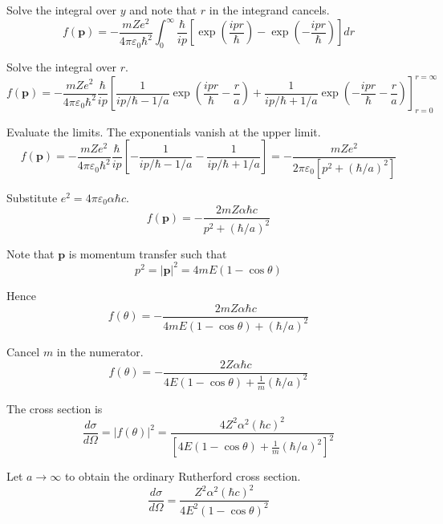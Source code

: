 Solve the integral over $y$ and note that $r$ in the integrand cancels.
\begin{equation*}
f(\mathbf p)=-\frac{mZe^2}{4\pi\varepsilon_0\hbar^2}
\int_0^\infty
\frac{\hbar}{ip}
\left[\exp\left(\frac{ipr}{\hbar}\right)-\exp\left(-\frac{ipr}{\hbar}\right)\right]
dr
\end{equation*}

Solve the integral over $r$.
\begin{equation*}
f(\mathbf p)=-\frac{mZe^2}{4\pi\varepsilon_0\hbar^2}
\frac{\hbar}{ip}
\left[
\frac{1}{ip/\hbar-1/a}
\exp\left(\frac{ipr}{\hbar}-\frac{r}{a}\right)
+\frac{1}{ip/\hbar+1/a}
\exp\left(-\frac{ipr}{\hbar}-\frac{r}{a}\right)
\right]_{r=0}^{r=\infty}
\end{equation*}

Evaluate the limits. The exponentials vanish at the upper limit.
\begin{equation*}
f(\mathbf p)=-\frac{mZe^2}{4\pi\varepsilon_0\hbar^2}
\frac{\hbar}{ip}
\left[
-\frac{1}{ip/\hbar-1/a}
-\frac{1}{ip/\hbar+1/a}
\right]
=-\frac{mZe^2}{2\pi\varepsilon_0\left[p^2+(\hbar/a)^2\right]}
\tag{1}
\end{equation*}

Substitute $e^2=4\pi\varepsilon_0\alpha\hbar c$.
\begin{equation*}
f(\mathbf p)=-\frac{2mZ\alpha\hbar c}{p^2+(\hbar/a)^2}
\end{equation*}

Note that $\mathbf p$ is momentum transfer such that
\begin{equation*}
p^2=|\mathbf p|^2=4mE(1-\cos\theta)
\end{equation*}

Hence
\begin{equation*}
f(\theta)=-\frac{2mZ\alpha\hbar c}{4mE(1-\cos\theta)+(\hbar/a)^2}
\tag{2}
\end{equation*}

Cancel $m$ in the numerator.
\begin{equation*}
f(\theta)=-\frac{2Z\alpha\hbar c}{4E(1-\cos\theta)+\frac{1}{m}(\hbar/a)^2}
\end{equation*}

The cross section is
\begin{equation*}
\frac{d\sigma}{d\Omega}=|f(\theta)|^2
=\frac{4Z^2\alpha^2(\hbar c)^2}{\left[4E(1-\cos\theta)+\frac{1}{m}(\hbar/a)^2\right]^2}
\end{equation*}

Let $a\rightarrow\infty$ to obtain the ordinary Rutherford cross section.
\begin{equation*}
\frac{d\sigma}{d\Omega}
=\frac{Z^2\alpha^2(\hbar c)^2}{4E^2(1-\cos\theta)^2}
\end{equation*}


